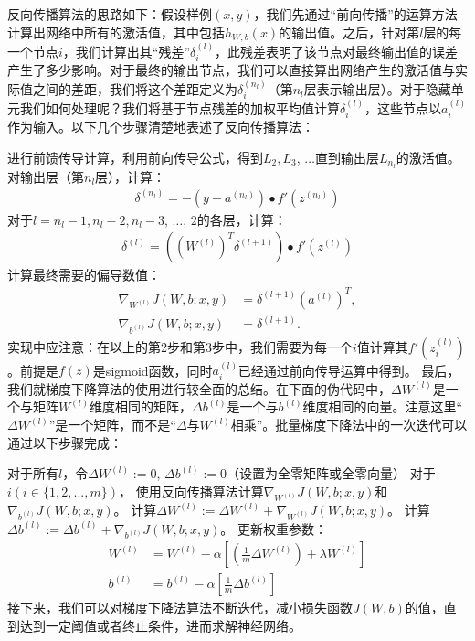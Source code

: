反向传播算法的思路如下：假设样例$(x,y)$，我们先通过“前向传播”的运算方法计算出网络中所有的激活值，其中包括$h_{W,b}(x)$的输出值。之后，针对第$l$层的每一个节点$i$，我们计算出其“残差”$\delta^{(l)}_i$，此残差表明了该节点对最终输出值的误差产生了多少影响。对于最终的输出节点，我们可以直接算出网络产生的激活值与实际值之间的差距，我们将这个差距定义为$\delta^{(n_l)}_i$（第$n_l$层表示输出层）。对于隐藏单元我们如何处理呢？我们将基于节点残差的加权平均值计算$\delta^{(l)}_i$，这些节点以$a^{(l)}_i$作为输入。以下几个步骤清楚地表述了反向传播算法：\par
进行前馈传导计算，利用前向传导公式，得到$L_2, L_3$, $\ldots$直到输出层$L_{n_l}$的激活值。
对输出层（第$n_l$层），计算：
\begin{align}
	\delta^{(n_l)}
	= - (y - a^{(n_l)}) \bullet f'(z^{(n_l)})
\end{align}
对于$l = n_l-1, n_l-2, n_l-3$, $\ldots$, $2$的各层，计算：
\begin{align}
	\delta^{(l)} = \left((W^{(l)})^T \delta^{(l+1)}\right) \bullet f'(z^{(l)})
\end{align}
计算最终需要的偏导数值：
\begin{align}
	\nabla_{W^{(l)}} J(W,b;x,y) &= \delta^{(l+1)} (a^{(l)})^T, \\
	\nabla_{b^{(l)}} J(W,b;x,y) &= \delta^{(l+1)}.
\end{align}
实现中应注意：在以上的第2步和第3步中，我们需要为每一个$i$值计算其$f'(z^{(l)}_i)$。前提是$f(z)$是sigmoid函数，同时$a^{(l)}_i$已经通过前向传导运算中得到。
最后，我们就梯度下降算法的使用进行较全面的总结。在下面的伪代码中，$\Delta W^{(l)}$是一个与矩阵$W^{(l)}$维度相同的矩阵，$\Delta b^{(l)}$是一个与$b^{(l)}$维度相同的向量。注意这里“$\Delta W^{(l)}$”是一个矩阵，而不是“$ \Delta$与$W^{(l)}$相乘”。批量梯度下降法中的一次迭代可以通过以下步骤完成：\par

对于所有$l$，令$\Delta W^{(l)} := 0$, $\Delta b^{(l)} := 0 $（设置为全零矩阵或全零向量）
对于$i(i \in \{1, 2, ..., m\})$，
使用反向传播算法计算$\nabla_{W^{(l)}} J(W,b;x,y)$和$\nabla_{b^{(l)}} J(W,b;x,y)$。
计算$\Delta W^{(l)} := \Delta W^{(l)} + \nabla_{W^{(l)}} J(W,b;x,y)$。
计算$\Delta b^{(l)} := \Delta b^{(l)} + \nabla_{b^{(l)}} J(W,b;x,y)$。
更新权重参数：
\begin{align}
	W^{(l)} &= W^{(l)} - \alpha \left[ \left(\frac{1}{m} \Delta W^{(l)} \right) + \lambda W^{(l)}\right] \\
	b^{(l)} &= b^{(l)} - \alpha \left[\frac{1}{m} \Delta b^{(l)}\right]
\end{align}
接下来，我们可以对梯度下降法算法不断迭代，减小损失函数$J(W,b)$的值，直到达到一定阈值或者终止条件，进而求解神经网络。

